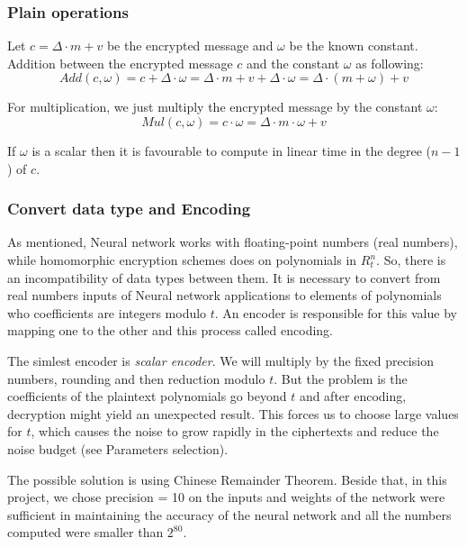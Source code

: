 \documentclass[A4paper,12pt]{article}
\begin{document}
	\subsubsection{Plain operations}
	
Let $c = \Delta \cdot m + v$ be the encrypted message and $\omega$ be the known constant. Addition between the encrypted message $c$ and the constant $\omega$ as following: 
\begin{equation*}
	Add(c, \omega) = c + \Delta \cdot \omega = \Delta \cdot m + v + \Delta \cdot \omega = \Delta \cdot (m + \omega) + v
\end{equation*}

For multiplication, we just multiply the encrypted message by the constant $\omega$:
\begin{equation*}
	Mul(c, \omega) = c \cdot \omega = \Delta \cdot m \cdot \omega + v
\end{equation*}

If $\omega$ is a scalar then it is favourable to compute in linear time in the degree ($n - 1$) of $c$.

	\subsubsection{Convert data type and Encoding}
As mentioned, Neural network works with floating-point numbers (real numbers), while homomorphic encryption schemes does on polynomials in $R_t^n$. So, there is an incompatibility of data types between them. It is necessary to convert from real numbers inputs of Neural network applications to elements of polynomials who coefficients are integers modulo $t$. An encoder is responsible for this value by mapping one to the other and this process called encoding.

The simlest encoder is \textit{scalar encoder}. We will multiply by the fixed precision numbers, rounding and then reduction modulo $t$. But the problem is the coefficients of the plaintext polynomials go beyond $t$ and after encoding, decryption might yield an unexpected result. This forces us to choose large values for $t$, which causes the noise to grow rapidly in the ciphertexts and reduce the noise budget (see Parameters selection).

The possible solution is using Chinese Remainder Theorem. Beside that, in this project, we chose precision = 10 on the inputs and weights of the network were sufficient in maintaining the accuracy of the neural network and all the numbers computed were smaller than $2^{80}$.
\end{document}
